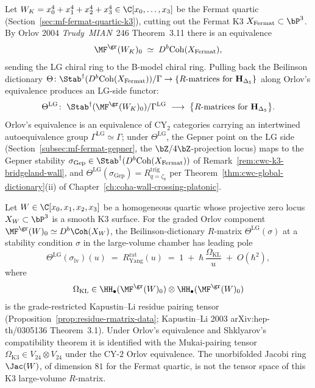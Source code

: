 \begin{remark}
\label{rem:mf-beilinson-pullback}
Let $W_K=x_0^4+x_1^4+x_2^4+x_3^4\in\C[x_0,\dots,x_3]$ be the Fermat
quartic (Section~\ref{sec:mf-fermat-quartic-k3}), cutting out the
Fermat K3 $X_{\mathrm{Fermat}}\subset\bP^3$. By Orlov 2004
\emph{Trudy~MIAN}~246 Theorem~3.11 there is an equivalence
\[
 \MF^{\gr}(W_K)_0\;\simeq\;D^b\mathrm{Coh}(X_{\mathrm{Fermat}}),
\]
sending the LG chiral ring to the B-model chiral ring. Pulling back
the Beilinson dictionary
$\Theta\colon\Stab^\dagger(D^b\mathrm{Coh}(X_{\mathrm{Fermat}}))/\Gamma
\to\{R\text{-matrices for }\mathbf{H}_{\Delta_5}\}$
along Orlov's equivalence produces an LG-side functor:
\[
 \Theta^{\mathrm{LG}}\colon\;
 \Stab^\dagger(\MF^{\gr}(W_K)_0)/\Gamma^{\mathrm{LG}}
 \;\longrightarrow\;
 \bigl\{R\text{-matrices for }\mathbf{H}_{\Delta_5}\bigr\}.
\]
Orlov's equivalence is an equivalence of CY$_2$ categories carrying an
intertwined autoequivalence group
$\Gamma^{\mathrm{LG}}\simeq\Gamma$; under $\Theta^{\mathrm{LG}}$, the
Gepner point on the LG side
(Section~\ref{subsec:mf-fermat-gepner}, the $\bZ/4\bZ$-projection
locus) maps to the Gepner stability
$\sigma_{\mathrm{Gep}}\in\Stab^\dagger(D^b\mathrm{Coh}(X_{\mathrm{Fermat}}))$
of Remark~\ref{rem:cwc-k3-bridgeland-wall}, and
$\Theta^{\mathrm{LG}}(\sigma_{\mathrm{Gep}})=R^{\mathrm{trig}}_{q=\zeta_8}$
per Theorem~\ref{thm:cwc-global-dictionary}(ii) of
Chapter~\ref{ch:coha-wall-crossing-platonic}.
\end{remark}

\begin{theorem}
\label{thm:mf-kl-leading-pole}
Let \(W\in \C[x_0,x_1,x_2,x_3]\) be a homogeneous quartic whose projective
zero locus \(X_W\subset \bP^3\) is a smooth K3 surface. For the graded
Orlov component \(\MF^{\gr}(W)_0\simeq D^b\Coh(X_W)\), the
Beilinson-dictionary \(R\)-matrix
$\Theta^{\mathrm{LG}}(\sigma)$ at a stability condition $\sigma$ in the
large-volume chamber has leading pole
\[
 \Theta^{\mathrm{LG}}(\sigma_{\mathrm{lv}})(u)
 \;=\;
 R^{\mathrm{rat}}_{\mathrm{Yang}}(u)
 \;=\;
 1\;+\;\hbar\,\frac{\Omega_{\mathrm{KL}}}{u}
 \;+\;O(\hbar^2),
\]
where
\[
\Omega_{\mathrm{KL}}\in
\HH_\bullet(\MF^{\gr}(W)_0)\otimes
\HH_\bullet(\MF^{\gr}(W)_0)
\]
is the grade-restricted Kapustin--Li residue pairing tensor
(Proposition~\ref{prop:residue-rmatrix-data}; Kapustin--Li 2003
\textup{arXiv:hep-th/0305136} Theorem~3.1). Under Orlov's equivalence
and Shklyarov's compatibility theorem it is identified with the
Mukai-pairing tensor
$\Omega_{\mathrm{K3}}\in V_{24}\otimes V_{24}$ under the CY-$2$
Orlov equivalence.
The unorbifolded Jacobi ring \(\Jac(W)\), of dimension \(81\) for the
Fermat quartic, is not the tensor space of this K3 large-volume
\(R\)-matrix.
\end{theorem}

